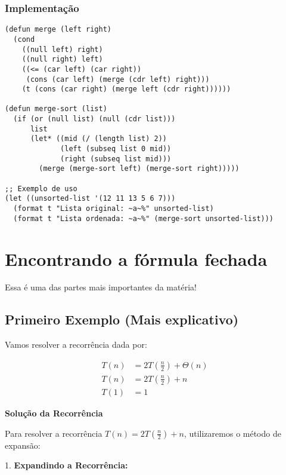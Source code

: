 \documentclass{article}
\begin{document}
\subsubsection{Implementação}
\begin{verbatim}
(defun merge (left right)
  (cond
    ((null left) right)
    ((null right) left)
    ((<= (car left) (car right))
     (cons (car left) (merge (cdr left) right)))
    (t (cons (car right) (merge left (cdr right))))))

(defun merge-sort (list)
  (if (or (null list) (null (cdr list)))
      list
      (let* ((mid (/ (length list) 2))
             (left (subseq list 0 mid))
             (right (subseq list mid)))
        (merge (merge-sort left) (merge-sort right)))))

;; Exemplo de uso
(let ((unsorted-list '(12 11 13 5 6 7)))
  (format t "Lista original: ~a~%" unsorted-list)
  (format t "Lista ordenada: ~a~%" (merge-sort unsorted-list)))
\end{verbatim}

\section{Encontrando a fórmula fechada}
\begin{tcolorbox}[
  colback=yellow!10!white, 
  colframe=red!75!black,  
  fonttitle=\bfseries,     
  coltitle=black,         
  sharp corners=south,     
  boxrule=1mm,             
  title=Seção Importante,  
  width=\textwidth         
]
  Essa é uma das partes mais importantes da matéria!
\end{tcolorbox}
\subsection{Primeiro Exemplo (Mais explicativo)}

Vamos resolver a recorrência dada por:

\begin{align*}
    T(n) &= 2T\left(\frac{n}{2}\right) + \Theta(n) \\
    T(n) &= 2T\left(\frac{n}{2}\right) + n \\
    T(1) &= 1
\end{align*}

\textbf{Solução da Recorrência}

Para resolver a recorrência \(T(n) = 2T\left(\frac{n}{2}\right) + n\), utilizaremos o método de expansão:

1. \textbf{Expandindo a Recorrência:}
\end{document}
